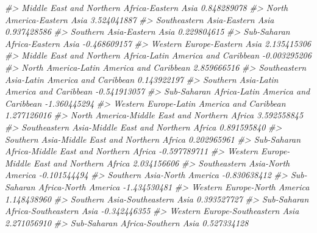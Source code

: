 \documentclass[
]{book}
\newenvironment{Shaded}{\begin{snugshade}}{\end{snugshade}}
\newcommand{\CommentTok}[1]{\textcolor[rgb]{0.56,0.35,0.01}{\textit{#1}}}
\theoremstyle{definition}
\theoremstyle{definition}
\theoremstyle{definition}
\theoremstyle{definition}
\theoremstyle{remark}
\begin{document}
\begin{Shaded}
\begin{Highlighting}[]
\CommentTok{\#\textgreater{} Middle East and Northern Africa{-}Eastern Asia                 0.848289078}
\CommentTok{\#\textgreater{} North America{-}Eastern Asia                                   3.524041887}
\CommentTok{\#\textgreater{} Southeastern Asia{-}Eastern Asia                               0.937428586}
\CommentTok{\#\textgreater{} Southern Asia{-}Eastern Asia                                   0.229804615}
\CommentTok{\#\textgreater{} Sub{-}Saharan Africa{-}Eastern Asia                             {-}0.468609157}
\CommentTok{\#\textgreater{} Western Europe{-}Eastern Asia                                  2.135415306}
\CommentTok{\#\textgreater{} Middle East and Northern Africa{-}Latin America and Caribbean {-}0.003295206}
\CommentTok{\#\textgreater{} North America{-}Latin America and Caribbean                    2.859666516}
\CommentTok{\#\textgreater{} Southeastern Asia{-}Latin America and Caribbean                0.143922197}
\CommentTok{\#\textgreater{} Southern Asia{-}Latin America and Caribbean                   {-}0.541913057}
\CommentTok{\#\textgreater{} Sub{-}Saharan Africa{-}Latin America and Caribbean              {-}1.360445294}
\CommentTok{\#\textgreater{} Western Europe{-}Latin America and Caribbean                   1.277126016}
\CommentTok{\#\textgreater{} North America{-}Middle East and Northern Africa                3.592558845}
\CommentTok{\#\textgreater{} Southeastern Asia{-}Middle East and Northern Africa            0.891595840}
\CommentTok{\#\textgreater{} Southern Asia{-}Middle East and Northern Africa                0.202965961}
\CommentTok{\#\textgreater{} Sub{-}Saharan Africa{-}Middle East and Northern Africa          {-}0.597789711}
\CommentTok{\#\textgreater{} Western Europe{-}Middle East and Northern Africa               2.034156606}
\CommentTok{\#\textgreater{} Southeastern Asia{-}North America                             {-}0.101544494}
\CommentTok{\#\textgreater{} Southern Asia{-}North America                                 {-}0.830638412}
\CommentTok{\#\textgreater{} Sub{-}Saharan Africa{-}North America                            {-}1.434530481}
\CommentTok{\#\textgreater{} Western Europe{-}North America                                 1.148438960}
\CommentTok{\#\textgreater{} Southern Asia{-}Southeastern Asia                              0.393527727}
\CommentTok{\#\textgreater{} Sub{-}Saharan Africa{-}Southeastern Asia                        {-}0.342446355}
\CommentTok{\#\textgreater{} Western Europe{-}Southeastern Asia                             2.271056910}
\CommentTok{\#\textgreater{} Sub{-}Saharan Africa{-}Southern Asia                             0.527334128}

\end{Highlighting}
\end{Shaded}
\end{document}
